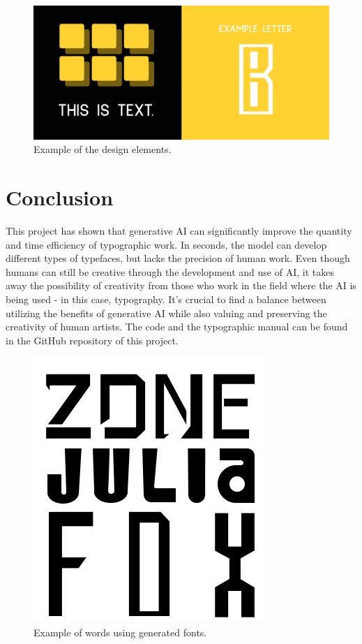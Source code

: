\documentclass[11pt]{article}
\begin{document}
\begin{figure}[hbt!]
    \centering
    \includegraphics[width=0.75\columnwidth]{design.png}
    \caption{Example of the design elements.}
    \label{fig:design}
\end{figure}
\FloatBarrier

\section{Conclusion}
This project has shown that generative AI can significantly improve the quantity and time efficiency of typographic work. In seconds, the model can develop different types of typefaces, but lacks the precision of human work. Even though humans can still be creative through the development and use of AI, it takes away the possibility of creativity from those who work in the field where the AI is being used - in this case, typography. It's crucial to find a balance between utilizing the benefits of generative AI while also valuing and preserving the creativity of human artists.
The code and the typographic manual can be found in the GitHub repository \cite{fontGenerationGan} of this project.

\begin{figure}[hbt!]
    \centering
    \includegraphics[width=0.35\columnwidth]{font_examples.png}
    \caption{Example of words using generated fonts.}
    \label{fig:font_examples}
\end{figure}
\FloatBarrier

\printbibliography
\end{document}
